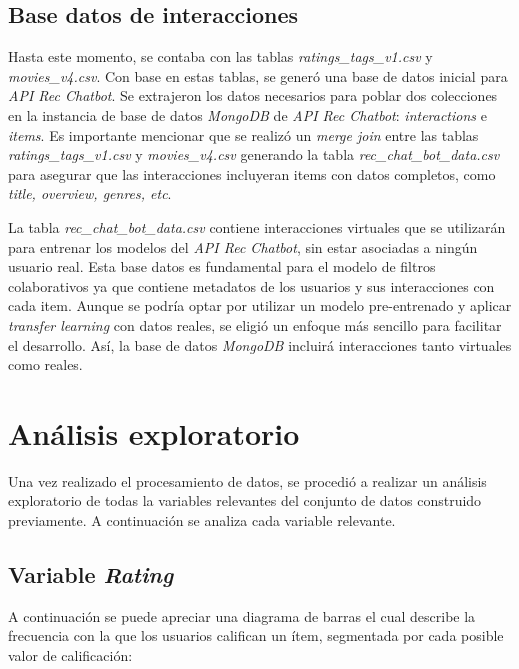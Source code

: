 \documentclass[11pt,a4paper,twoside]{thesis}
\begin{document}
\subsection{Base datos de interacciones}

Hasta este momento, se contaba con las tablas \textit{ratings\_tags\_v1.csv} y \textit{movies\_v4.csv}. Con base en estas tablas, se generó una base de datos inicial para \textit{API Rec Chatbot}. Se extrajeron los datos necesarios para poblar dos colecciones en la instancia de base de datos \textit{MongoDB} de \textit{API Rec Chatbot}: \textit{interactions} e \textit{items}. Es importante mencionar que se realizó un \textit{merge join} entre las tablas \textit{ratings\_tags\_v1.csv} y \textit{movies\_v4.csv} generando la tabla \textit{rec\_chat\_bot\_data.csv} para asegurar que las interacciones incluyeran items con datos completos, como \textit{title, overview, genres, etc}.

La tabla \textit{rec\_chat\_bot\_data.csv} contiene interacciones virtuales que se utilizarán para entrenar
los modelos del \textit{API Rec Chatbot}, sin estar asociadas a ningún usuario real. Esta base datos es fundamental
para el modelo de filtros colaborativos ya que contiene metadatos de los usuarios y sus interacciones con cada item.
Aunque se podría optar por utilizar un modelo pre-entrenado y aplicar \textit{transfer learning} con datos reales,
se eligió un enfoque más sencillo para facilitar el desarrollo. Así, la base de datos \textit{MongoDB} incluirá interacciones
tanto virtuales como reales.

\clearpage

\section{Análisis exploratorio}


Una vez realizado el procesamiento de datos, se procedió a realizar un análisis exploratorio de todas la variables relevantes del conjunto de datos construido previamente.
A continuación se analiza cada variable relevante.

\subsection{Variable \textit{Rating}}

A continuación se puede apreciar una diagrama de barras el cual describe la
frecuencia con la que los usuarios califican un ítem, segmentada por cada
posible valor de calificación:
\end{document}
